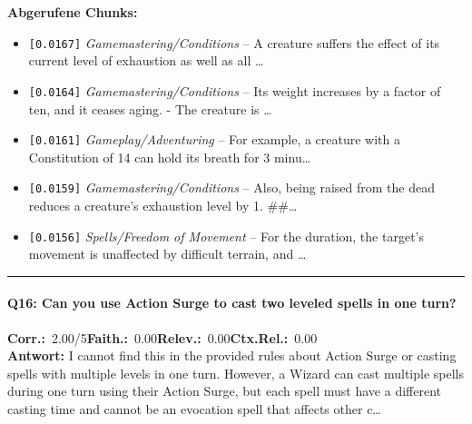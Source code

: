 \noindent\textbf{Abgerufene Chunks:}
\begin{itemize}[noitemsep, topsep=2pt]
  \item[\textbf{\#1}] \texttt{[0.0167]} \textit{Gamemastering/Conditions} -- A creature suffers the effect of its current level of exhaustion as well as all \ldots
  \item[\textbf{\#2}] \texttt{[0.0164]} \textit{Gamemastering/Conditions} -- Its weight increases by a factor of ten, and it ceases aging. - The creature is \ldots
  \item[\textbf{\#3}] \texttt{[0.0161]} \textit{Gameplay/Adventuring} -- For example, a creature with a Constitution of 14 can hold its breath for 3 minu\ldots
  \item[\textbf{\#4}] \texttt{[0.0159]} \textit{Gamemastering/Conditions} -- Also, being raised from the dead reduces a creature's exhaustion level by 1.  \#\#\ldots
  \item[\textbf{\#5}] \texttt{[0.0156]} \textit{Spells/Freedom of Movement} -- For the duration, the target's movement is unaffected by difficult terrain, and \ldots
\end{itemize}
\vspace{4pt}
\hrule
\vspace{6pt}

\paragraph{Q16: Can you use Action Surge to cast two leveled spells in one turn?}
\noindent \textbf{Corr.:}~2.00/5\quad \textbf{Faith.:}~0.00\quad \textbf{Relev.:}~0.00\quad \textbf{Ctx.Rel.:}~0.00\\

\noindent\textbf{Antwort:} I cannot find this in the provided rules about Action Surge or casting spells with multiple levels in one turn. However, a Wizard can cast multiple spells during one turn using their Action Surge, but each spell must have a different casting time and cannot be an evocation spell that affects other c\ldots

